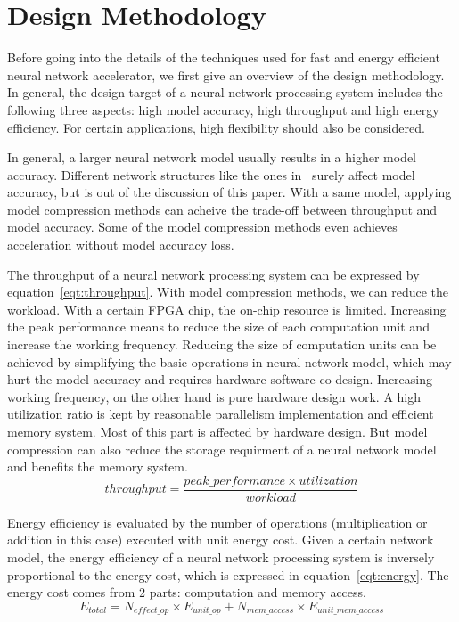 \section{Design Methodology}\label{sec:design_method}

Before going into the details of the techniques used for fast and energy efficient neural network accelerator, we first give an overview of the design methodology. In general, the design target of a neural network processing system includes the following three aspects: high model accuracy, high throughput and high energy efficiency. For certain applications, high flexibility should also be considered.

In general, a larger neural network model usually results in a higher model accuracy. Different network structures like the ones in~\cite{krizhevsky2012imagenet, simonyan2014very, he2016deep} surely affect model accuracy, but is out of the discussion of this paper. With a same model, applying model compression methods can acheive the trade-off between throughput and model accuracy. Some of the model compression methods even achieves acceleration without model accuracy loss.

The throughput of a neural network processing system can be expressed by equation~\ref{eqt:throughput}. With model compression methods, we can reduce the workload. With a certain FPGA chip, the on-chip resource is limited. Increasing the peak performance means to reduce the size of each computation unit and increase the working frequency. Reducing the size of computation units can be achieved by simplifying the basic operations in neural network model, which may hurt the model accuracy and requires hardware-software co-design. Increasing working frequency, on the other hand is pure hardware design work. A high utilization ratio is kept by reasonable parallelism implementation and efficient memory system. Most of this part is affected by hardware design. But model compression can also reduce the storage requirment of a neural network model and benefits the memory system.
\begin{equation}\label{eqt:throughput}
    throughput = \frac{peak\_performance \times utilization}{workload}
\end{equation}

Energy efficiency is evaluated by the number of operations (multiplication or addition in this case) executed with unit energy cost. Given a certain network model, the energy efficiency of a neural network processing system is inversely proportional to the energy cost, which is expressed in equation~\ref{eqt:energy}. The energy cost comes from 2 parts: computation and memory access. 
\begin{equation}\label{eqt:energy}
    E_{total} = N_{effect\_op}\times E_{unit\_op} + N_{mem\_access}\times E_{unit\_mem\_access}
\end{equation}

